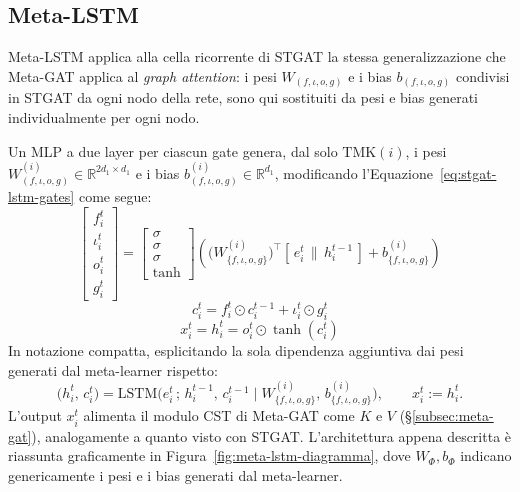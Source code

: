\subsection{Meta-LSTM}
\label{subsec:meta-lstm}

Meta-LSTM applica alla cella ricorrente di STGAT
la stessa generalizzazione che Meta-GAT applica al \emph{graph attention}:
i pesi $W_{(f, \iota, o, g)}$ e i bias $b_{(f, \iota, o, g)}$ condivisi in STGAT da ogni nodo della rete,
sono qui sostituiti da pesi e bias generati individualmente per ogni nodo.

Un MLP a due layer per ciascun gate genera, dal solo $\mathrm{TMK}(i)$, i pesi \\
$W_{(f, \iota, o, g)}^{(i)} \in \mathbb{R}^{2d_1 \times d_1}$ e i bias $b_{(f, \iota, o, g)}^{(i)} \in \mathbb{R}^{d_1}$,
modificando l'Equazione~\ref{eq:stgat-lstm-gates} come segue:
\begin{equation}
  \begin{bmatrix} f_i^t \\ \iota_i^t \\ o_i^t \\ g_i^t \end{bmatrix} =
  \begin{bmatrix} \sigma \\ \sigma \\ \sigma \\ \tanh \end{bmatrix}
  \left(
  \Big(W_{\{f,\iota,o,g\}}^{(i)}\Big)^{\!\top} [\,e_i^t \,\|\, h_i^{t-1}\,] + b_{\{f,\iota,o,g\}}^{(i)}
  \right)
  \label{eq:metalstm-gates}
\end{equation}
\begin{equation}
  c_i^t = f_i^t \odot c_i^{t-1} + \iota_i^t \odot g_i^t
\end{equation}
\begin{equation}
  x_i^t = h_i^t = o_i^t \odot \tanh(c_i^t)
\end{equation}
In notazione compatta, esplicitando la sola dipendenza aggiuntiva dai pesi
generati dal meta-learner rispetto:
\begin{equation}
  \big(h_i^t,\, c_i^t\big) = \mathrm{LSTM}\Big(e_i^t \,;\, h_i^{t-1},\, c_i^{t-1} \;\Big|\; W_{\{f,\iota,o,g\}}^{(i)},\, b_{\{f,\iota,o,g\}}^{(i)}\Big), \qquad x_i^t := h_i^t.
  \label{eq:metalstm-compact}
\end{equation}
L'output $x_i^t$ alimenta il modulo CST di Meta-GAT come $K$ e $V$ (§\ref{subsec:meta-gat}),
analogamente a quanto visto con STGAT.
L'architettura appena descritta è riassunta graficamente in Figura~\ref{fig:meta-lstm-diagramma},
dove $W_{\Phi},b_{\Phi}$ indicano genericamente i pesi e i bias generati dal meta-learner.

